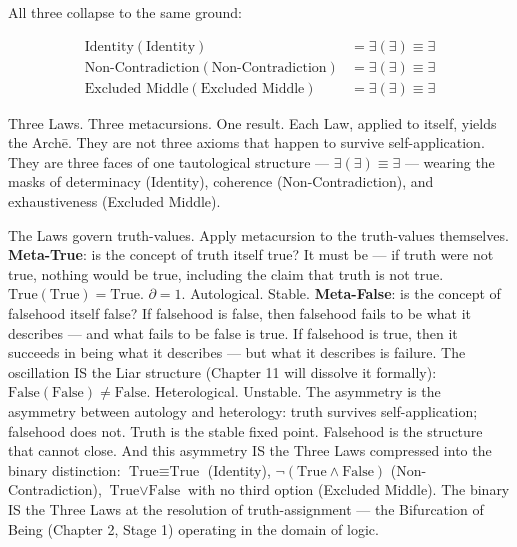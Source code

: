 \documentclass[10pt, openany, oneside]{book}
\begin{document}
\noindent All three collapse to the same ground:

\begin{align*}
\text{Identity}(\text{Identity}) &= \exists(\exists) \equiv \exists \\
\text{Non-Contradiction}(\text{Non-Contradiction}) &= \exists(\exists) \equiv \exists \\
\text{Excluded Middle}(\text{Excluded Middle}) &= \exists(\exists) \equiv \exists
\end{align*}

\noindent Three Laws. Three metacursions. One result. Each Law, applied to itself, yields the Arch\={e}. They are not three axioms that happen to survive self-application. They are three faces of one tautological structure --- $\exists(\exists) \equiv \exists$ --- wearing the masks of determinacy (Identity), coherence (Non-Contradiction), and exhaustiveness (Excluded Middle).

The Laws govern truth-values. Apply metacursion to the truth-values themselves. \textbf{Meta-True}: is the concept of truth itself true? It must be --- if truth were not true, nothing would be true, including the claim that truth is not true. $\text{True}(\text{True}) = \text{True}$. $\partial = 1$. Autological. Stable. \textbf{Meta-False}: is the concept of falsehood itself false? If falsehood is false, then falsehood fails to be what it describes --- and what fails to be false is true. If falsehood is true, then it succeeds in being what it describes --- but what it describes is failure. The oscillation IS the Liar structure (Chapter 11 will dissolve it formally): $\text{False}(\text{False}) \neq \text{False}$. Heterological. Unstable. The asymmetry is the asymmetry between autology and heterology: truth survives self-application; falsehood does not. Truth is the stable fixed point. Falsehood is the structure that cannot close. And this asymmetry IS the Three Laws compressed into the binary distinction: $\text{True} \equiv \text{True}$ (Identity), $\neg(\text{True} \wedge \text{False})$ (Non-Contradiction), $\text{True} \vee \text{False}$ with no third option (Excluded Middle). The binary IS the Three Laws at the resolution of truth-assignment --- the Bifurcation of Being (Chapter 2, Stage 1) operating in the domain of logic.
\end{document}
